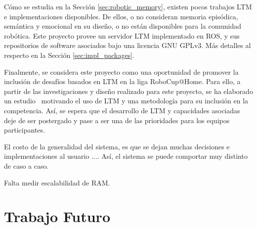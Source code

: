 \begin{conclusion}




Cómo se estudia en la Sección \ref{sec:robotic_memory}, existen pocos trabajos LTM e implementaciones disponibles. De ellos, o no consideran memoria episódica, semántica y emocional en su diseño, o no están disponibles para la comunidad robótica. Este proyecto provee un servidor LTM implementado en ROS, y sus repositorios de software asociados bajo una licencia GNU GPLv3. Más detalles al respecto en la Sección \ref{sec:impl_packages}.

Finalmente, se considera este proyecto como una oportunidad de promover la inclusión de desafíos basados en LTM en la liga RoboCup@Home. Para ello, a partir de las investigaciones y diseño realizado para este proyecto, se ha elaborado un estudio~\cite{ltm_in_robocup} motivando el uso de LTM y una metodología para su inclusión en la competencia. Así, se espera que el desarrollo de LTM y capacidades asociadas deje de ser postergado y pase a ser una de las prioridades para los equipos participantes.

El costo de la generalidad del sistema, es que se dejan muchas decisiones e implementaciones al usuario .... Así, el sistema se puede comportar muy distinto de caso a caso.

Falta medir escalabilidad de RAM.

\section*{Trabajo Futuro}





\end{conclusion}
